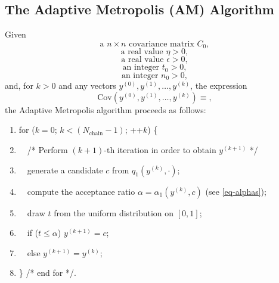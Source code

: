 \subsection{The Adaptive Metropolis (AM) Algorithm}\label{subsc-mcmc-am-alg}
Given
\begin{equation}\label{eq-C0}
\mbox{a }n\times n\mbox{ covariance matrix }C_0,
\end{equation}
\begin{equation}\label{eq-sd}
\mbox{a real value }\eta >0,
\end{equation}
\begin{equation}\label{eq-epsilon}
\mbox{a real value }\epsilon>0,
\end{equation}
\begin{equation}\label{eq-t0}
\mbox{an integer }t_0>0,
\end{equation}
\begin{equation}\label{eq-n0}
\mbox{an integer }n_0>0,
\end{equation}
and, for $k > 0$ and any vectors $y^{(0)},y^{(1)},\ldots,y^{(k)}$, the expression
\begin{equation}\label{eq-emperical-cov}
\mbox{Cov}(y^{(0)},y^{(1)},\ldots,y^{(k)})\equiv,
\end{equation}
the Adaptive Metropolis algorithm proceeds as follows:
\begin{enumerate}
\item for ($k=0$; $k < (N_{\mbox{chain}}-1)$; ++$k$) \{
\item $\quad$/* Perform $(k+1)$-th iteration in order to obtain $y^{(k+1)}$ */
\item $\quad$generate a candidate $c$ from $q_1(y^{(k)},\cdot)$;
\item $\quad$compute the acceptance ratio $\alpha=\alpha_1(y^{(k)},c)$ (see \eqref{eq-alphas});
\item $\quad$draw $t$ from the uniform distribution on $[0,1]$;
\item $\quad$if ($t\leqslant \alpha$) $y^{(k+1)}=c$;
\item $\quad$else $y^{(k+1)}=y^{(k)}$;
\item \} /* end for */.
\end{enumerate}

